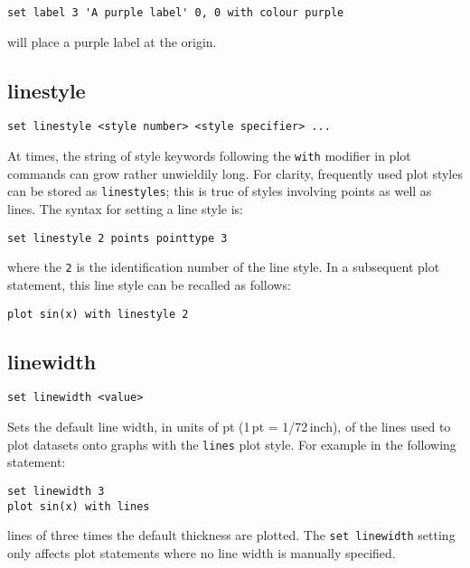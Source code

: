 \begin{verbatim}
set label 3 'A purple label' 0, 0 with colour purple
\end{verbatim}

\noindent will place a purple label at the origin.

\subsection{linestyle}

\begin{verbatim}
set linestyle <style number> <style specifier> ...
\end{verbatim}

At times, the string of style keywords following the {\tt with} modifier in plot
commands can grow rather unwieldily long. For clarity, frequently used plot
styles can be stored as {\tt linestyles}; this is true of styles involving
points as well as lines. The syntax for setting a line style is:

\begin{verbatim}
set linestyle 2 points pointtype 3
\end{verbatim}

\noindent where the {\tt 2} is the identification number of the line style.
In a subsequent plot statement, this line style can be recalled as follows:

\begin{verbatim}
plot sin(x) with linestyle 2
\end{verbatim}


\subsection{linewidth}

\begin{verbatim}
set linewidth <value>
\end{verbatim}

Sets the default line width, in units of pt (1\,pt = 1/72\,inch), of the lines
used to plot datasets onto graphs with the {\tt lines} plot style.  For
example in the following statement:

\begin{verbatim}
set linewidth 3
plot sin(x) with lines
\end{verbatim}

\noindent lines of three times the default thickness are plotted.  The
{\tt set linewidth} setting only affects plot statements where no line width is
manually specified.

